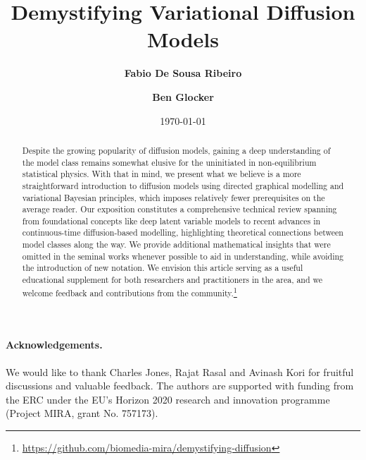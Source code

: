 \documentclass{article}
\title{Demystifying Variational Diffusion Models\vspace*{1cm}}
\author[1]{\textbf{Fabio De Sousa Ribeiro}}
\author[1]{\textbf{Ben Glocker}}
\affil[1]{Department of Computing, Imperial College London, UK \authorcr {\small \texttt{\{fdesousa,b.glocker\}@imperial.ac.uk}
}}
\date{\normalsize \today}
\begin{document}
\maketitle
\thispagestyle{empty}

\begin{abstract}
    Despite the growing popularity of diffusion models, gaining a deep understanding of the model class remains somewhat elusive for the uninitiated in non-equilibrium statistical physics. With that in mind, we present what we believe is a more straightforward introduction to diffusion models using directed graphical modelling and variational Bayesian principles, which imposes relatively fewer prerequisites on the average reader. Our exposition constitutes a comprehensive technical review spanning from foundational concepts like deep latent variable models to recent advances in continuous-time diffusion-based modelling, highlighting theoretical connections between model classes along the way. We provide additional mathematical insights that were omitted in the seminal works whenever possible to aid in understanding, while avoiding the introduction of new notation. We envision this article serving as a useful educational supplement for both researchers and practitioners in the area, and we welcome feedback and contributions from the community.\footnote{\url{https://github.com/biomedia-mira/demystifying-diffusion}}
\end{abstract}

\newpage
{\hypersetup{hidelinks}
\tableofcontents
}

\newpage

\newpage






\paragraph{Acknowledgements.} We would like to thank Charles Jones, Rajat Rasal and Avinash Kori for fruitful discussions and valuable feedback. The authors are supported with funding from the ERC under the EU’s Horizon 2020 research and innovation programme (Project MIRA, grant No. 757173).



\end{document}
